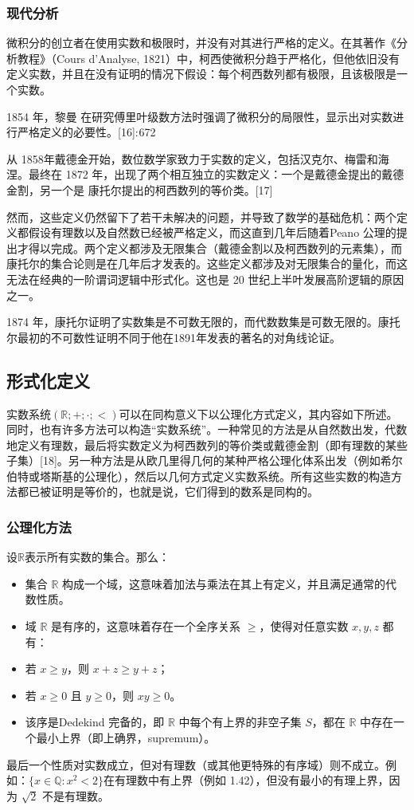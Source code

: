 \subsubsection{现代分析}
微积分的创立者在使用实数和极限时，并没有对其进行严格的定义。在其著作《分析教程》（Cours d'Analyse, 1821）中，柯西使微积分趋于严格化，但他依旧没有定义实数，并且在没有证明的情况下假设：每个柯西数列都有极限，且该极限是一个实数。

1854 年，黎曼 在研究傅里叶级数方法时强调了微积分的局限性，显示出对实数进行严格定义的必要性。[16]: 672 

从 1858年戴德金开始，数位数学家致力于实数的定义，包括汉克尔、梅雷和海涅。最终在 1872 年，出现了两个相互独立的实数定义：一个是戴德金提出的戴德金割，另一个是 康托尔提出的柯西数列的等价类。[17]

然而，这些定义仍然留下了若干未解决的问题，并导致了数学的基础危机：两个定义都假设有理数以及自然数已经被严格定义，而这直到几年后随着Peano 公理的提出才得以完成。两个定义都涉及无限集合（戴德金割以及柯西数列的元素集），而康托尔的集合论则是在几年后才发表的。这些定义都涉及对无限集合的量化，而这无法在经典的一阶谓词逻辑中形式化。这也是 20 世纪上半叶发展高阶逻辑的原因之一。

1874 年，康托尔证明了实数集是不可数无限的，而代数数集是可数无限的。康托尔最初的不可数性证明不同于他在1891年发表的著名的对角线论证。
\subsection{形式化定义}
实数系统$(\mathbb{R}; +; \cdot; <)$可以在同构意义下以公理化方式定义，其内容如下所述。同时，也有许多方法可以构造“实数系统”。一种常见的方法是从自然数出发，代数地定义有理数，最后将实数定义为柯西数列的等价类或戴德金割（即有理数的某些子集）[18]。另一种方法是从欧几里得几何的某种严格公理化体系出发（例如希尔伯特或塔斯基的公理化），然后以几何方式定义实数系统。所有这些实数的构造方法都已被证明是等价的，也就是说，它们得到的数系是同构的。
\subsubsection{公理化方法}
设$\mathbb{R}$表示所有实数的集合。那么：
\begin{itemize}
\item 集合 $\mathbb{R}$ 构成一个域，这意味着加法与乘法在其上有定义，并且满足通常的代数性质。
\item 域 $\mathbb{R}$ 是有序的，这意味着存在一个全序关系 $\geq$，使得对任意实数 $x, y, z$ 都有：
\item 若 $x \geq y$，则 $x+z \geq y+z$；
\item 若 $x \geq 0$ 且 $y \geq 0$，则 $xy \geq 0$。
\item 该序是Dedekind 完备的，即 $\mathbb{R}$ 中每个有上界的非空子集 $S$，都在 $\mathbb{R}$ 中存在一个最小上界（即上确界，supremum）。
\end{itemize}
最后一个性质对实数成立，但对有理数（或其他更特殊的有序域）则不成立。例如：$\{x \in \mathbb{Q} : x^{2} < 2\}$在有理数中有上界（例如 1.42），但没有最小的有理上界，因为 $\sqrt{2}$ 不是有理数。

